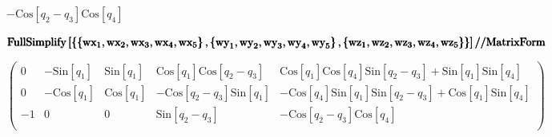 \documentclass{article}
\begin{document}
\begin{doublespace}
\noindent\(-\text{Cos}\left[q_2-q_3\right] \text{Cos}\left[q_4\right]\)
\end{doublespace}

\begin{doublespace}
\noindent\(\pmb{\text{}}\\
\pmb{\text{FullSimplify}\left[\left\{\left\{\text{wx}_1,\text{wx}_2,\text{wx}_3,\text{wx}_4,\text{wx}_5\right\},\left\{\text{wy}_1,\text{wy}_2,\text{wy}_3,\text{wy}_4,\text{wy}_5\right\},\left\{\text{wz}_1,\text{wz}_2,\text{wz}_3,\text{wz}_4,\text{wz}_5\right\}\right\}\right]\text{//}\text{MatrixForm}}\)
\end{doublespace}

\begin{doublespace}
\noindent\(\left(
\begin{array}{ccccc}
 0 & -\text{Sin}\left[q_1\right] & \text{Sin}\left[q_1\right] & \text{Cos}\left[q_1\right] \text{Cos}\left[q_2-q_3\right] & \text{Cos}\left[q_1\right]
\text{Cos}\left[q_4\right] \text{Sin}\left[q_2-q_3\right]+\text{Sin}\left[q_1\right] \text{Sin}\left[q_4\right] \\
 0 & -\text{Cos}\left[q_1\right] & \text{Cos}\left[q_1\right] & -\text{Cos}\left[q_2-q_3\right] \text{Sin}\left[q_1\right] & -\text{Cos}\left[q_4\right]
\text{Sin}\left[q_1\right] \text{Sin}\left[q_2-q_3\right]+\text{Cos}\left[q_1\right] \text{Sin}\left[q_4\right] \\
 -1 & 0 & 0 & \text{Sin}\left[q_2-q_3\right] & -\text{Cos}\left[q_2-q_3\right] \text{Cos}\left[q_4\right] \\
\end{array}
\right)\)
\end{doublespace}
\end{document}
